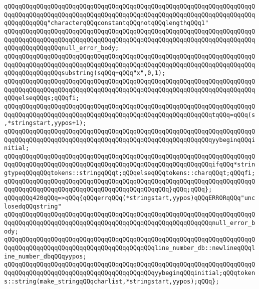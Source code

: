 \verb|qQQqqQQqqQQqqQQqqQQqqQQqqQQqqQQqqQQqqQQqqQQqqQQqqQQqqQQqqQQqqQQqqQQqqQQqqQQqqQQqqQQqqQQqqQQqqQQqqQQqqQQqqQQqqQQqqQQqqQQqqQQqqQQqqQQqqQQqqQQqqQQqqQQqqQQq"characterqQQqconstantqQQqnotqQQqlengthqQQq1"|\newline
\verb|qQQqqQQqqQQqqQQqqQQqqQQqqQQqqQQqqQQqqQQqqQQqqQQqqQQqqQQqqQQqqQQqqQQqqQQqqQQqqQQqqQQqqQQqqQQqqQQqqQQqqQQqqQQqqQQqqQQqqQQqqQQqqQQqqQQqqQQqqQQqqQQqqQQqqQQqqQQqnull_error_body;|\newline
\verb|qQQqqQQqqQQqqQQqqQQqqQQqqQQqqQQqqQQqqQQqqQQqqQQqqQQqqQQqqQQqqQQqqQQqqQQqqQQqqQQqqQQqqQQqqQQqqQQqqQQqqQQqqQQqqQQqqQQqqQQqqQQqqQQqqQQqqQQqqQQqqQQqqQQqqQQqqQQqsubstring(sqQQq+qQQq"x",0,1);|\newline
\verb|qQQqqQQqqQQqqQQqqQQqqQQqqQQqqQQqqQQqqQQqqQQqqQQqqQQqqQQqqQQqqQQqqQQqqQQqqQQqqQQqqQQqqQQqqQQqqQQqqQQqqQQqqQQqqQQqqQQqqQQqqQQqqQQqqQQqqQQqqQQqqQQqelseqQQqs;qQQqfi;|\newline
\verb|qQQqqQQqqQQqqQQqqQQqqQQqqQQqqQQqqQQqqQQqqQQqqQQqqQQqqQQqqQQqqQQqqQQqqQQqqQQqqQQqqQQqqQQqqQQqqQQqqQQqqQQqqQQqqQQqqQQqqQQqqQQqqQQqtqQQq=qQQq(s,*stringstart,yypos+1);|\newline
\verb|qQQqqQQqqQQqqQQqqQQqqQQqqQQqqQQqqQQqqQQqqQQqqQQqqQQqqQQqqQQqqQQqqQQqqQQqqQQqqQQqqQQqqQQqqQQqqQQqqQQqqQQqqQQqqQQqqQQqqQQqqQQqqQQqyybeginqQQqinitial;|\newline
\verb|qQQqqQQqqQQqqQQqqQQqqQQqqQQqqQQqqQQqqQQqqQQqqQQqqQQqqQQqqQQqqQQqqQQqqQQqqQQqqQQqqQQqqQQqqQQqqQQqqQQqqQQqqQQqqQQqqQQqqQQqqQQqqQQqifqQQq*stringtypeqQQqqQQqtokens::stringqQQqt;qQQqelseqQQqtokens::charqQQqt;qQQqfi;|\newline
\verb|qQQqqQQqqQQqqQQqqQQqqQQqqQQqqQQqqQQqqQQqqQQqqQQqqQQqqQQqqQQqqQQqqQQqqQQqqQQqqQQqqQQqqQQqqQQqqQQqqQQqqQQqqQQqqQQqqQQq}qQQq;qQQq};|\newline
\verb|qQQqqQQq420qQQq=>qQQq{qQQqerrqQQq(*stringstart,yypos)qQQqERRORqQQq"unclosedqQQqstring"|\newline
\verb|qQQqqQQqqQQqqQQqqQQqqQQqqQQqqQQqqQQqqQQqqQQqqQQqqQQqqQQqqQQqqQQqqQQqqQQqqQQqqQQqqQQqqQQqqQQqqQQqqQQqqQQqqQQqqQQqqQQqqQQqqQQqqQQqnull_error_body;|\newline
\verb|qQQqqQQqqQQqqQQqqQQqqQQqqQQqqQQqqQQqqQQqqQQqqQQqqQQqqQQqqQQqqQQqqQQqqQQqqQQqqQQqqQQqqQQqqQQqqQQqqQQqqQQqqQQqqQQqline_number_db::newlineqQQqline_number_dbqQQqyypos;|\newline
\verb|qQQqqQQqqQQqqQQqqQQqqQQqqQQqqQQqqQQqqQQqqQQqqQQqqQQqqQQqqQQqqQQqqQQqqQQqqQQqqQQqqQQqqQQqqQQqqQQqqQQqqQQqqQQqqQQqyybeginqQQqinitial;qQQqtokens::string(make_stringqQQqcharlist,*stringstart,yypos);qQQq};|\newline
